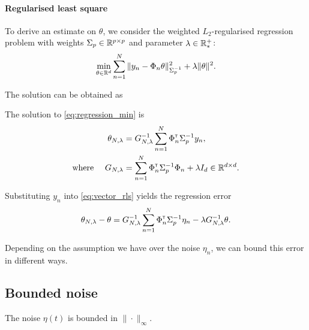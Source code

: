 \paragraph{Regularised least square} To derive an estimate on $\theta$, we consider the weighted $L_2$-regularised regression problem with weights $\Sigma_p\in\mathbb{R}^{p\times p}$ and parameter $\lambda\in\mathbb{R}^+_*$:
\begin{equation}
\label{eq:regression_min}
\min_{\theta\in\mathbb{R}^d} \sum_{n=1}^N \|y_n -\Phi_n\theta\|_{\Sigma_p^{-1}}^2 + \lambda\|\theta\|_{}^2.
\end{equation}


The solution can be obtained as

\begin{proposition}
	\label{prop:regularized_solution}
	\begin{leftbar}[propositionbar]
	The solution to \eqref{eq:regression_min} is
	\begin{align}
	\label{eq:vector_rls}
	\theta_{N,\lambda} &= G_{N, \lambda}^{-1} \sum_{n=1}^N \Phi_n^{\mathsf{\scriptscriptstyle T}} \Sigma_p^{-1} y_n,\\
	\label{eq:g_n_lambda}
	\text{where }\quad G_{N, \lambda} &= \sum_{n=1}^N \Phi_{n}^{\mathsf{\scriptscriptstyle T}}\Sigma_p^{-1}\Phi_{n}  + \lambda I_d \in \mathbb{R}^{d\times d}.
	\end{align}
	\end{leftbar}
\end{proposition}

Substituting $y_n$ into \eqref{eq:vector_rls} yields the regression error
\begin{align}
\theta_{N,\lambda} - \theta = G_{N, \lambda}^{-1}\sum_{n=1}^N \Phi_n^{\mathsf{\scriptscriptstyle T}} \Sigma_p^{-1}\eta_n - \lambda G_{N, \lambda}^{-1}\theta.
\end{align}


Depending on the assumption we have over the noise $\eta_n$, we can bound this error in different ways.


\subsection{Bounded noise}

\begin{assumption}
	\label{assumpt:bounded-noise}
	\begin{leftbar}[assumptionbar]
	The noise $\eta(t)$ is bounded in $\|\cdot\|_\infty$.
	\end{leftbar}
\end{assumption}

